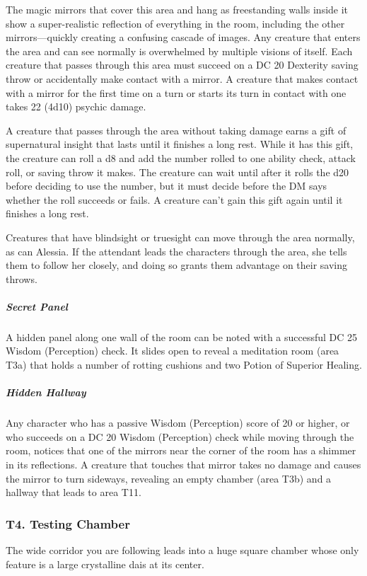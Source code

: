 \documentclass[10pt,a4paper,twoside,bg=print,twocolumn,openany,nodeprecatedcode]{dndbook}
\begin{document}
The magic mirrors that cover this area and hang as freestanding walls inside it show a super-realistic reflection of everything in the room, including the other mirrors—quickly creating a confusing cascade of images. Any creature that enters the area and can see normally is overwhelmed by multiple visions of itself. Each creature that passes through this area must succeed on a DC 20 Dexterity saving throw or accidentally make contact with a mirror. A creature that makes contact with a mirror for the first time on a turn or starts its turn in contact with one takes 22 (4d10) psychic damage.

A creature that passes through the area without taking damage earns a gift of supernatural insight that lasts until it finishes a long rest. While it has this gift, the creature can roll a d8 and add the number rolled to one ability check, attack roll, or saving throw it makes. The creature can wait until after it rolls the d20 before deciding to use the number, but it must decide before the DM says whether the roll succeeds or fails. A creature can't gain this gift again until it finishes a long rest.

Creatures that have blindsight or truesight can move through the area normally, as can Alessia. If the attendant leads the characters through the area, she tells them to follow her closely, and doing so grants them advantage on their saving throws.

\subparagraph{Secret Panel}
A hidden panel along one wall of the room can be noted with a successful DC 25 Wisdom (Perception) check. It slides open to reveal a meditation room (area T3a) that holds a number of rotting cushions and two Potion of Superior Healing.

\subparagraph{Hidden Hallway}
Any character who has a passive Wisdom (Perception) score of 20 or higher, or who succeeds on a DC 20 Wisdom (Perception) check while moving through the room, notices that one of the mirrors near the corner of the room has a shimmer in its reflections. A creature that touches that mirror takes no damage and causes the mirror to turn sideways, revealing an empty chamber (area T3b) and a hallway that leads to area T11.

\subsubsection{T4. Testing Chamber}
\begin{DndReadAloud}{}
The wide corridor you are following leads into a huge square chamber whose only feature is a large crystalline dais at its center.

\end{DndReadAloud}
\end{document}
